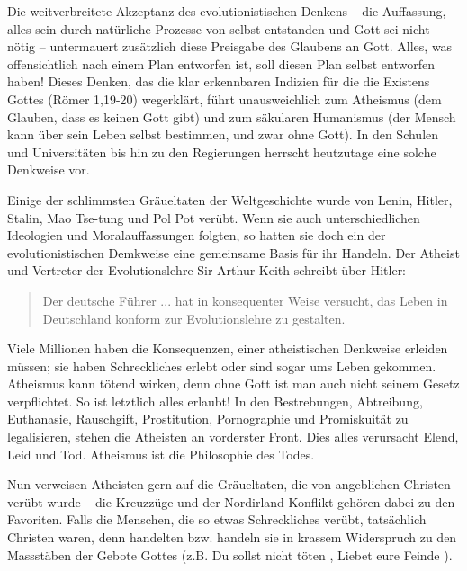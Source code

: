 \documentclass{../inc/mybibbook}
\begin{document}
Die weitverbreitete Akzeptanz des evolutionistischen Denkens -- die Auffassung, alles sein durch natürliche Prozesse von selbst entstanden und Gott sei nicht nötig -- untermauert zusätzlich diese Preisgabe des Glaubens an Gott. Alles, was offensichtlich nach einem Plan entworfen ist, soll diesen Plan selbst entworfen haben! Dieses Denken, das die klar erkennbaren Indizien für die die Existens Gottes (Römer 1,19-20) wegerklärt, führt unausweichlich zum Atheismus (dem Glauben, dass es keinen Gott gibt) und zum säkularen Humanismus (der Mensch kann über sein Leben selbst bestimmen, und zwar ohne Gott). In den Schulen und Universitäten bis hin zu den Regierungen herrscht heutzutage eine solche Denkweise vor.

Einige der schlimmsten Gräueltaten der Weltgeschichte wurde von Lenin, Hitler, Stalin, Mao Tse-tung und Pol Pot verübt. Wenn sie auch unterschiedlichen Ideologien und Moralauffassungen folgten, so hatten sie doch ein der evolutionistischen Demkweise eine gemeinsame Basis für ihr Handeln. Der Atheist und Vertreter der Evolutionslehre Sir Arthur Keith schreibt über Hitler: 
\begin{quote}  Der deutsche Führer ... hat in konsequenter Weise versucht, das Leben in Deutschland konform zur Evolutionslehre zu gestalten. \cite{keith1} \end{quote}
Viele Millionen haben die Konsequenzen, einer atheistischen Denkweise erleiden müssen; sie haben Schreckliches erlebt oder sind sogar ums Leben gekommen. Atheismus kann tötend wirken, denn ohne Gott ist man auch nicht seinem Gesetz verpflichtet. So ist letztlich alles erlaubt! In den Bestrebungen, Abtreibung, Euthanasie, Rauschgift, Prostitution, Pornographie und Promiskuität zu legalisieren, stehen die Atheisten an vorderster Front. Dies alles verursacht Elend, Leid und Tod. Atheismus ist die Philosophie des Todes.

Nun verweisen Atheisten gern auf die Gräueltaten, die von angeblichen \flqq Christen\frqq{} verübt wurde -- die Kreuzzüge und der Nordirland-Konflikt gehören dabei zu den Favoriten. Falls die Menschen, die so etwas Schreckliches verübt, tatsächlich Christen waren, denn handelten bzw. handeln sie in krassem Widerspruch zu den Massstäben der Gebote Gottes (z.B. \flqq Du sollst nicht töten \frq{}, \flqq Liebet eure Feinde \frq{}).
\end{document}
